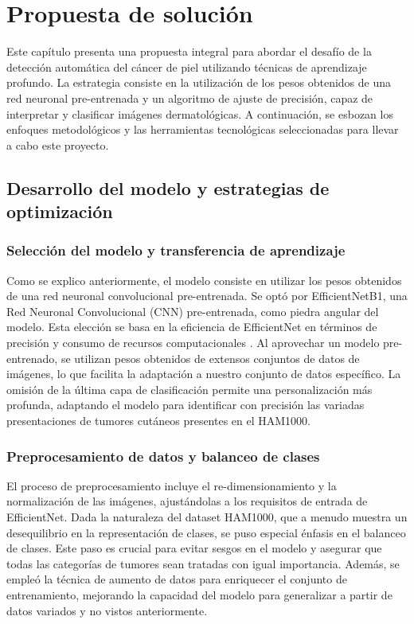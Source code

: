 \chapter{Propuesta de solución}\label{chapter:proposal}

Este capítulo presenta una propuesta integral para abordar el desafío de la detección automática del cáncer de piel utilizando técnicas de aprendizaje profundo. La estrategia consiste en la utilización  de los pesos obtenidos de una red neuronal pre-entrenada y un algoritmo de ajuste de precisión, capaz de interpretar y clasificar imágenes dermatológicas. A continuación, se esbozan los enfoques metodológicos y las herramientas tecnológicas seleccionadas para llevar a cabo este proyecto.

\section{Desarrollo del modelo y estrategias de optimización}\label{sec:method}

\subsection{Selección del modelo y transferencia de aprendizaje}

Como se explico anteriormente, el modelo consiste en utilizar los pesos obtenidos de una red neuronal convolucional pre-entrenada. Se optó por EfficientNetB1, una Red Neuronal Convolucional (CNN) pre-entrenada, como piedra angular del modelo. Esta elección se basa en la eficiencia de EfficientNet en términos de precisión y consumo de recursos computacionales . Al aprovechar un modelo pre-entrenado, se utilizan pesos obtenidos de extensos conjuntos de datos de imágenes, lo que facilita la adaptación a nuestro conjunto de datos específico. La omisión de la última capa de clasificación permite una personalización más profunda, adaptando el modelo para identificar con precisión las variadas presentaciones de tumores cutáneos presentes en el HAM1000.

\subsection{Preprocesamiento de datos y balanceo de clases}

El proceso de preprocesamiento incluye el re-dimensionamiento y la normalización de las imágenes, ajustándolas a los requisitos de entrada de EfficientNet. Dada la naturaleza del dataset HAM1000, que a menudo muestra un desequilibrio en la representación de clases, se puso especial énfasis en el balanceo de clases. Este paso es crucial para evitar sesgos en el modelo y asegurar que todas las categorías de tumores sean tratadas con igual importancia. Además, se empleó la técnica de aumento de datos para enriquecer el conjunto de entrenamiento, mejorando la capacidad del modelo para generalizar a partir de datos variados y no vistos anteriormente.

